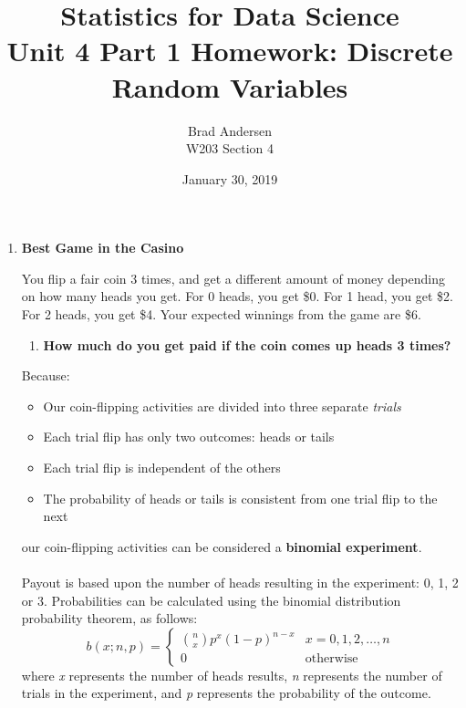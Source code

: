 \documentclass[12pt,a4paper]{article}
\title{Statistics for Data Science \\
    Unit 4 Part 1 Homework: Discrete Random Variables}
\author{Brad Andersen \\
    W203 Section 4}
\date{January 30, 2019}
\numberwithin{equation}{subsection}
\begin{document}
\maketitle

\begin{enumerate}


\item \textbf{Best Game in the Casino}

You flip a fair coin 3 times, and get a different amount of money depending on how many heads you get. For 0 heads, you get \$0. For 1 head, you get \$2. For 2 heads, you get \$4. Your expected winnings from the game are \$6. 

\begin{enumerate}
\item \textbf{How much do you get paid if the coin comes up heads 3 times?}
\end{enumerate}
Because:
\begin{itemize}
    \item Our coin-flipping activities are divided into three separate \textit{trials}
    \item Each trial flip has only two outcomes: heads or tails
    \item Each trial flip is independent of the others
    \item The probability of heads or tails is consistent from one trial flip to the next
\end{itemize}
our coin-flipping activities can be considered a \textbf{binomial experiment}.\\ \\
Payout is based upon the number of heads resulting in the experiment: 0, 1, 2 or 3.  Probabilities can be calculated using the binomial distribution probability theorem, as follows:
\begin{equation*}
    b(x; n, p) =
    \begin{cases}
    \binom{n}{x}p^{x}(1 - p)^{n - x} & x = 0, 1, 2, \dots, n\\
    0 & \text{otherwise}
    \end{cases}
\end{equation*}
where \textit{x} represents the number of heads results, \textit{n} represents the number of trials in the experiment, and \textit{p} represents the probability of the outcome. \\ \\

\end{enumerate}
\end{document}
